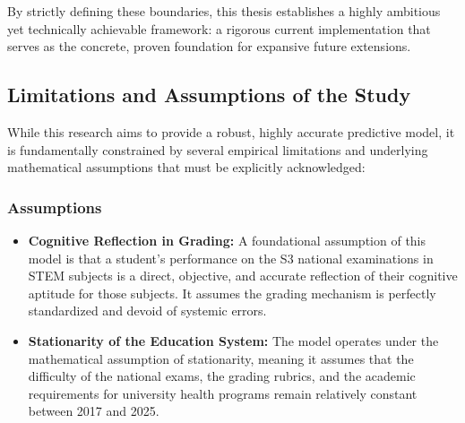 By strictly defining these boundaries, this thesis establishes a highly ambitious yet technically achievable framework: a rigorous current implementation that serves as the concrete, proven foundation for expansive future extensions.

\subsection{Limitations and Assumptions of the Study}

While this research aims to provide a robust, highly accurate predictive model, it is fundamentally constrained by several empirical limitations and underlying mathematical assumptions that must be explicitly acknowledged:

\subsubsection{Assumptions}
\begin{itemize}
    \item \textbf{Cognitive Reflection in Grading:} A foundational assumption of this model is that a student's performance on the S3 national examinations in STEM subjects is a direct, objective, and accurate reflection of their cognitive aptitude for those subjects. It assumes the grading mechanism is perfectly standardized and devoid of systemic errors.
    \item \textbf{Stationarity of the Education System:} The model operates under the mathematical assumption of stationarity, meaning it assumes that the difficulty of the national exams, the grading rubrics, and the academic requirements for university health programs remain relatively constant between 2017 and 2025.
\end{itemize}

